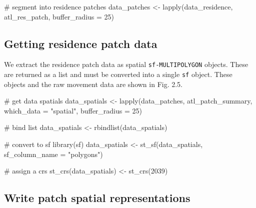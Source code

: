 \documentclass[]{scrreprt}
\newenvironment{Shaded}{}{}
\newcommand{\CommentTok}[1]{\textcolor[rgb]{0.00,0.50,0.00}{#1}}
\newcommand{\DataTypeTok}[1]{#1}
\newcommand{\DecValTok}[1]{#1}
\newcommand{\KeywordTok}[1]{\textcolor[rgb]{0.00,0.00,1.00}{#1}}
\newcommand{\NormalTok}[1]{#1}
\newcommand{\StringTok}[1]{\textcolor[rgb]{0.00,0.50,0.50}{#1}}
\begin{document}
\begin{Shaded}
\begin{Highlighting}[]
\CommentTok{# segment into residence patches}
\NormalTok{data_patches <-}\StringTok{ }\KeywordTok{lapply}\NormalTok{(data_residence, atl_res_patch,}
                       \DataTypeTok{buffer_radius =} \DecValTok{25}\NormalTok{)}
\end{Highlighting}
\end{Shaded}

\hypertarget{getting-residence-patch-data}{%
\subsection{Getting residence patch data}\label{getting-residence-patch-data}}

We extract the residence patch data as spatial \texttt{sf-MULTIPOLYGON} objects.
These are returned as a list and must be converted into a single \texttt{sf} object.
These objects and the raw movement data are shown in Fig. 2.5.

\begin{Shaded}
\begin{Highlighting}[]
\CommentTok{# get data spatials}
\NormalTok{data_spatials <-}\StringTok{ }\KeywordTok{lapply}\NormalTok{(data_patches, atl_patch_summary,}
                        \DataTypeTok{which_data =} \StringTok{"spatial"}\NormalTok{,}
                        \DataTypeTok{buffer_radius =} \DecValTok{25}\NormalTok{)}

\CommentTok{# bind list}
\NormalTok{data_spatials <-}\StringTok{ }\KeywordTok{rbindlist}\NormalTok{(data_spatials)}

\CommentTok{# convert to sf}
\KeywordTok{library}\NormalTok{(sf)}
\NormalTok{data_spatials <-}\StringTok{ }\KeywordTok{st_sf}\NormalTok{(data_spatials, }\DataTypeTok{sf_column_name =} \StringTok{"polygons"}\NormalTok{)}

\CommentTok{# assign a crs}
\KeywordTok{st_crs}\NormalTok{(data_spatials) <-}\StringTok{ }\KeywordTok{st_crs}\NormalTok{(}\DecValTok{2039}\NormalTok{)}
\end{Highlighting}
\end{Shaded}

\hypertarget{write-patch-spatial-representations}{%
\subsection{Write patch spatial representations}\label{write-patch-spatial-representations}}
\end{document}
